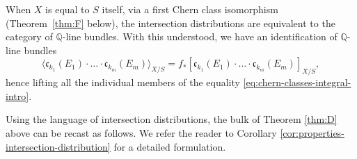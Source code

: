 \documentclass[JEP,XML,SOM,Unicode,published]{cedram}
\theoremstyle{plain}
\theoremstyle{definition}
\newcommand{\QBbb}{\mathbb Q}
\newcommand{\cfrak}{\mathfrak c}
\begin{document}
When $X$ is equal to $S$ itself, via a first Chern class isomorphism (\cf Theorem~\ref{thm:F} below), the intersection distributions are equivalent to the category of $\QBbb$-line bundles. With this understood, we have an identification of $\QBbb$-line bundles
\begin{displaymath}
\langle \cfrak_{k_1}(E_1) \cdot \ldots \cdot \cfrak_{k_m}(E_m) \rangle_{X/S} = f_\ast [ \cfrak_{k_1}(E_1) \cdot \ldots \cdot \cfrak_{k_m}(E_m) ]_{X/S},
\end{displaymath}
hence lifting all the individual members of the equality \eqref{eq:chern-classes-integral-intro}.

Using the language of intersection distributions, the bulk of Theorem \ref{thm:D} above can be recast as follows. We refer the reader to Corollary \ref{cor:properties-intersection-distribution} for a detailed formulation.
\end{document}
